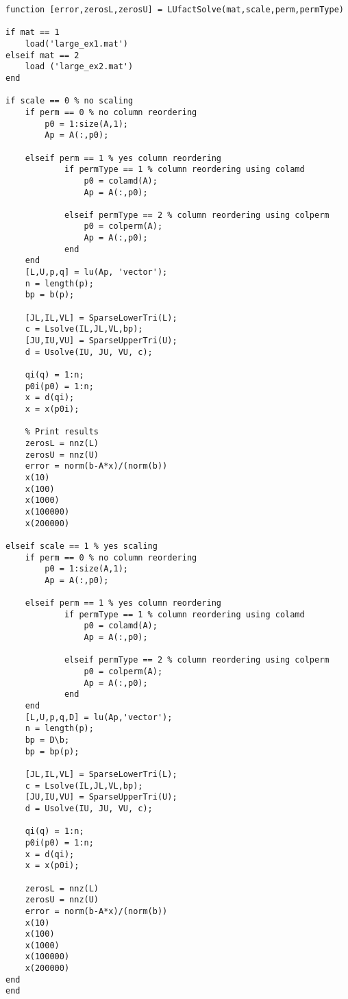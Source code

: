\documentclass[12pt]{article}
\begin{document}
\lstset{language=matlab,frame=single}
\begin{lstlisting}[caption= Solving $\text{Ax = b}$ using LU Factorization with Optional Scaling/Reordering]
function [error,zerosL,zerosU] = LUfactSolve(mat,scale,perm,permType)

if mat == 1
    load('large_ex1.mat')
elseif mat == 2
    load ('large_ex2.mat')
end

if scale == 0 % no scaling
    if perm == 0 % no column reordering
        p0 = 1:size(A,1);
        Ap = A(:,p0);
        
    elseif perm == 1 % yes column reordering
            if permType == 1 % column reordering using colamd
                p0 = colamd(A);
                Ap = A(:,p0);
                
            elseif permType == 2 % column reordering using colperm
                p0 = colperm(A);
                Ap = A(:,p0);  
            end
    end
    [L,U,p,q] = lu(Ap, 'vector');
    n = length(p);
    bp = b(p);

    [JL,IL,VL] = SparseLowerTri(L);
    c = Lsolve(IL,JL,VL,bp);
    [JU,IU,VU] = SparseUpperTri(U);
    d = Usolve(IU, JU, VU, c);

    qi(q) = 1:n;
    p0i(p0) = 1:n;
    x = d(qi);
    x = x(p0i);
    
    % Print results
    zerosL = nnz(L)
    zerosU = nnz(U)
    error = norm(b-A*x)/(norm(b))
    x(10)
    x(100)
    x(1000)
    x(100000)
    x(200000)
    
elseif scale == 1 % yes scaling
    if perm == 0 % no column reordering
        p0 = 1:size(A,1);
        Ap = A(:,p0);
        
    elseif perm == 1 % yes column reordering
            if permType == 1 % column reordering using colamd
                p0 = colamd(A);
                Ap = A(:,p0);
                
            elseif permType == 2 % column reordering using colperm
                p0 = colperm(A);
                Ap = A(:,p0);  
            end
    end
    [L,U,p,q,D] = lu(Ap,'vector');
    n = length(p);
    bp = D\b;
    bp = bp(p);

    [JL,IL,VL] = SparseLowerTri(L);
    c = Lsolve(IL,JL,VL,bp);
    [JU,IU,VU] = SparseUpperTri(U);
    d = Usolve(IU, JU, VU, c);

    qi(q) = 1:n;
    p0i(p0) = 1:n;
    x = d(qi);
    x = x(p0i);

    zerosL = nnz(L)
    zerosU = nnz(U)
    error = norm(b-A*x)/(norm(b))
    x(10)
    x(100)
    x(1000)
    x(100000)
    x(200000)
end
end  
\end{lstlisting}
\end{document}
